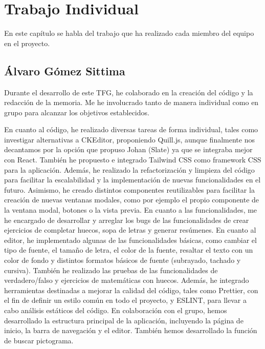 \chapter{Trabajo Individual}
\label{cap:TrabajoIndividual}

En este capítulo se habla del trabajo que ha realizado cada miembro del equipo en el proyecto.

\section{Álvaro Gómez Sittima}
Durante el desarrollo de este TFG, he colaborado en la creación del código y la redacción de la memoria. Me he involucrado tanto de manera individual como en grupo para alcanzar los objetivos establecidos.

En cuanto al código, he realizado diversas tareas de forma individual, tales como investigar alternativas a CKEditor, proponiendo Quill.js, aunque finalmente nos decantamos por la opción que propuso Johan (Slate) ya que se integraba mejor con React. También he propuesto e integrado Tailwind CSS como framework CSS para la aplicación. Además, he realizado la refactorización y limpieza del código para facilitar la escalabilidad y la implementación de nuevas funcionalidades en el futuro. Asimismo, he creado distintos componentes reutilizables para facilitar la creación de nuevas ventanas modales, como por ejemplo el propio componente de la ventana modal, botones o la vista previa. En cuanto a las funcionalidades, me he encargado de desarrollar y arreglar los bugs de las funcionalidades de crear ejercicios de completar huecos, sopa de letras y generar resúmenes. En cuanto al editor, he implementado algunas de las funcionalidades básicas, como cambiar el tipo de fuente, el tamaño de letra, el color de la fuente, resaltar el texto con un color de fondo y distintos formatos básicos de fuente (subrayado, tachado y cursiva). También he realizado las pruebas de las funcionalidades de verdadero/falso y ejercicios de matemáticas con huecos. Además, he integrado herramientas destinadas a mejorar la calidad del código, tales como Prettier, con el fin de definir un estilo común en todo el proyecto, y ESLINT, para llevar a cabo análisis estáticos del código. En colaboración con el grupo, hemos desarrollado la estructura principal de la aplicación, incluyendo la página de inicio, la barra de navegación y el editor. También hemos desarrollado la función de buscar pictograma.

